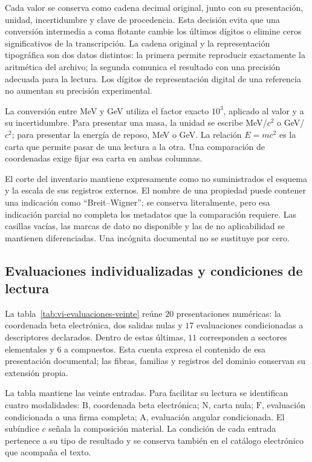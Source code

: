 Cada valor se conserva como cadena decimal original, junto con su
presentación, unidad, incertidumbre y clave de procedencia. Esta decisión
evita que una conversión intermedia a coma flotante cambie los últimos
dígitos o elimine ceros significativos de la transcripción. La cadena
original y la representación tipográfica son dos datos distintos: la
primera permite reproducir exactamente la aritmética del archivo; la
segunda comunica el resultado con una precisión adecuada para la lectura.
Los dígitos de representación digital de una referencia no aumentan su
precisión experimental.

La conversión entre MeV y GeV utiliza el factor exacto \(10^3\), aplicado
al valor y a su incertidumbre. Para presentar una masa, la unidad se escribe
MeV/\(c^2\) o GeV/\(c^2\); para presentar la energía de reposo,
MeV o GeV. La relación \(E=mc^2\) es la carta que permite pasar de una
lectura a la otra. Una comparación de coordenadas exige fijar esa carta en
ambas columnas.

El corte del inventario mantiene expresamente como no suministrados el
esquema y la escala de sus registros externos. El nombre de una propiedad
puede contener una indicación como ``Breit--Wigner''; se conserva literalmente,
pero esa indicación parcial no completa los metadatos que la comparación
requiere. Las casillas vacías, las marcas de dato no disponible y las de
no aplicabilidad se mantienen diferenciadas. Una incógnita documental
no se sustituye por cero.

\subsection{Evaluaciones individualizadas y condiciones de lectura}
\label{subsec:vi-evaluaciones-documentadas}

La tabla~\ref{tab:vi-evaluaciones-veinte} reúne \(20\) presentaciones
numéricas: la coordenada beta electrónica, dos salidas nulas y
\(17\) evaluaciones condicionadas a descriptores declarados. Dentro de
estas últimas, \(11\) corresponden a sectores elementales y \(6\) a
compuestos. Esta cuenta expresa el contenido de esa presentación documental;
las fibras, familias y registros del dominio conservan su extensión propia.

La tabla mantiene las veinte entradas. Para facilitar su lectura se
identifican cuatro modalidades: \(\mathrm{B}\), coordenada beta
electrónica; \(\mathrm{N}\), carta nula; \(\mathrm{F}\), evaluación
condicionada a una firma completa; \(\mathrm{A}\), evaluación angular
condicionada. El subíndice \(c\) señala la composición material. La
condición de cada entrada pertenece a su tipo de resultado y se conserva
también en el catálogo electrónico que acompaña el texto.

